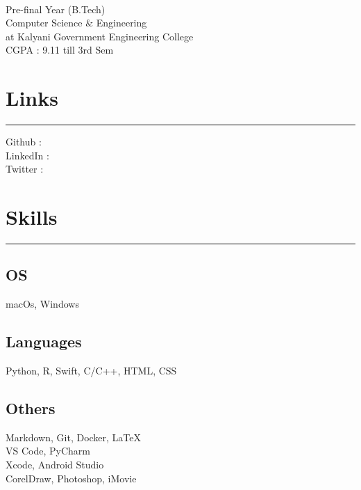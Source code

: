 \documentclass[]{debjitpal-resume}
\begin{document}
%
%

\begin{minipage}[t]{0.35\textwidth} 
\begin{large}
	\\
\end{large}
Pre-final Year (B.Tech)\\
Computer Science $\&$  Engineering\\ 
at Kalyani Government Engineering College \\ 
CGPA : 9.11 till 3rd Sem 
\section{Links} 
\noindent\rule{5cm}{0.4pt}

Github : \href{https://github.com/debjitpal5040}{} \\
LinkedIn : \href{https://www.linkedin.com/in/debjit-pal-539214192/}{} \\
Twitter : \href{https://www.twitter.com/debjitpal5040}{} 
\section{Skills}
\noindent\rule{5cm}{0.4pt}
\subsection{OS}
macOs, Windows
\vspace{6pt}
\subsection{Languages}
Python, R, Swift, C/C++, HTML, CSS
\vspace{6pt}
\subsection{Others}
Markdown, Git, Docker, LaTeX \\
VS Code, PyCharm \\
Xcode, Android Studio \\
CorelDraw, Photoshop, iMovie
\sectionsep

\end{minipage}
\end{document}
